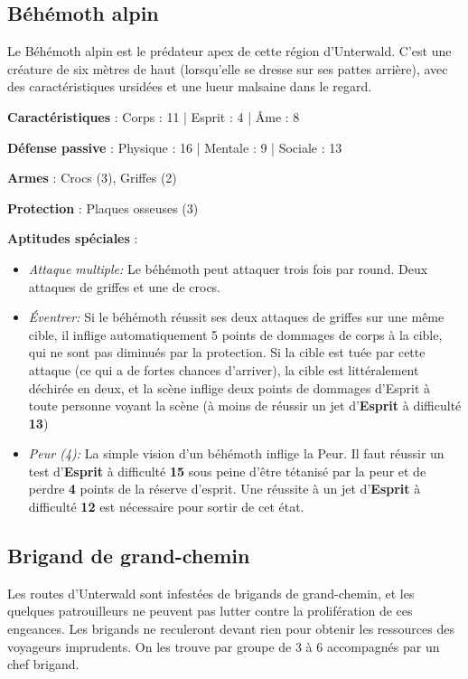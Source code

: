 \documentclass[10pt,twoside,twocolumn,openany,bg=print,justified]{dndbook}
\begin{document}
\subsection*{Béhémoth alpin}

Le Béhémoth alpin est le prédateur apex de cette région d'Unterwald. C'est une créature de six mètres de haut (lorsqu'elle se dresse sur ses pattes arrière), avec des caractéristiques ursidées et une lueur malsaine dans le regard.

\textbf{Caractéristiques} : Corps : 11 | Esprit : 4 | Âme : 8

\textbf{Défense passive} : Physique : 16 | Mentale : 9 | Sociale : 13

\textbf{Armes} : Crocs (3), Griffes (2)

\textbf{Protection} : Plaques osseuses (3)

\textbf{Aptitudes spéciales} : 

\begin{itemize}
	\item \textit{Attaque multiple:} Le béhémoth peut attaquer trois fois par round. Deux attaques de griffes et une de crocs.
	\item \textit{Éventrer:} Si le béhémoth réussit ses deux attaques de griffes sur une même cible, il inflige automatiquement 5 points de dommages de corps à la cible, qui ne sont pas diminués par la protection. Si la cible est tuée par cette attaque (ce qui a de fortes chances d'arriver), la cible est littéralement déchirée en deux, et la scène inflige deux points de dommages d'Esprit à toute personne voyant la scène (à moins de réussir un jet d'\textbf{Esprit} à difficulté \textbf{13})
	\item \textit{Peur (4):} La simple vision d'un béhémoth inflige la Peur. Il faut réussir un test d'\textbf{Esprit} à difficulté \textbf{15} sous peine d'être tétanisé par la peur et de perdre \textbf{4} points de la réserve d'esprit. Une réussite à un jet d'\textbf{Esprit} à difficulté \textbf{12} est nécessaire pour sortir de cet état. 
\end{itemize}

\subsection*{Brigand de grand-chemin}

Les routes d'Unterwald sont infestées de brigands de grand-chemin, et les quelques patrouilleurs ne peuvent pas lutter contre la prolifération de ces engeances. Les brigands ne reculeront devant rien pour obtenir les ressources des voyageurs imprudents. On les trouve par groupe de 3 à 6 accompagnés par un chef brigand.
\end{document}
